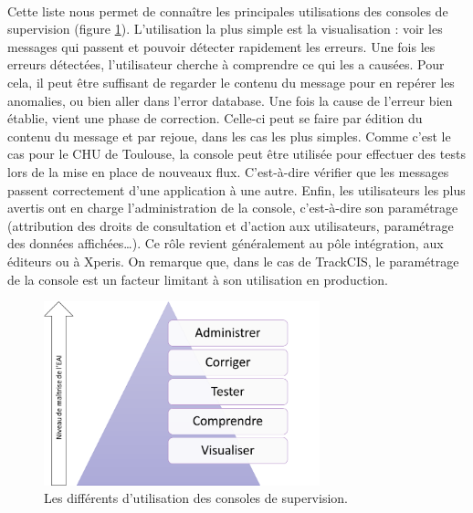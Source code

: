 			\paragraph{}
			Cette liste nous permet de connaître les principales utilisations des
			consoles de supervision (figure \ref{usage_consoles}). L’utilisation la plus
			simple est la visualisation : voir les messages qui passent et pouvoir détecter rapidement
			les erreurs. Une fois les erreurs détectées, l’utilisateur cherche à
			comprendre ce qui les a causées. Pour cela, il peut être suffisant de
			regarder le contenu du message pour en repérer les anomalies, ou bien aller
			dans l’error database. Une fois la cause de l’erreur bien établie, vient une
			phase de correction. Celle-ci peut se faire par édition du contenu du
			message et par rejoue, dans les cas les plus simples. Comme c’est le cas
			pour le CHU de Toulouse, la console peut être utilisée pour effectuer des
			tests lors de la mise en place de nouveaux flux. C’est-à-dire vérifier que
			les messages passent correctement d’une application à une autre. Enfin, les
			utilisateurs les plus avertis ont en charge l’administration de la console,
			c’est-à-dire son paramétrage (attribution des droits de consultation et
			d’action aux utilisateurs, paramétrage des données affichées\ldots). Ce rôle
			revient généralement au pôle intégration, aux éditeurs ou à Xperis. On
			remarque que, dans le cas de TrackCIS, le paramétrage de la console est un
			facteur limitant à son utilisation en production.
			\begin{figure}[H]%
				\centering
				\includegraphics[width=8cm]{../img/usage_1.png}
				\caption{\label{usage_consoles} Les différents d'utilisation des consoles de
				supervision.}
			\end{figure}
			
